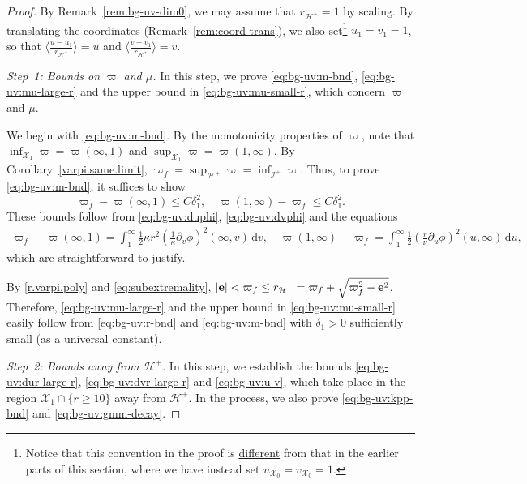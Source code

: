 \documentclass[10pt, reqno]{amsart}
\theoremstyle{definition}
\theoremstyle{remark}
\theoremstyle{conjecture}
\numberwithin{equation}{section}
\newcommand{\brk}[1]{\langle#1\rangle}
\newcommand{\set}[1]{\{#1\}}
\newcommand{\ud}{\mathrm{d}}
\newcommand{\rd}{\partial}
\newcommand{\0}{\emptyset}
\newcommand{\dlt}{\delta}
\newcommand{\kpp}{\kappa}
\newcommand{\bfe}{{\bf e}}
\newcommand{\calH}{\mathcal H}
\newcommand{\calI}{\mathcal I}
\newcommand{\calX}{\mathcal X}
\newcommand{\dur}{\nu}
\newcommand{\EH}{\calH^{+}}
\newcommand{\pfstep}[1]{\vspace{.5em} {\it \noindent #1.}}
\newcommand{\e}{\bfe}							%
\newcommand{\NI}{\calI^{+}}						%
\begin{document}
\begin{proof}
By Remark~\ref{rem:bg-uv-dim0}, we may assume that $r_{\EH} = 1$ by scaling. By translating the coordinates (Remark~\ref{rem:coord-trans}), we also set\footnote{Notice that this convention in the proof is \underline{different} from that in the earlier parts of this section, where we have instead set $u_{\calX_0}=v_{\calX_0}=1$.} $u_{1} = v_{1} = 1$, so that $\brk{\tfrac{u - u_{1}}{r_{\EH}}} = u$ and $\brk{\tfrac{v - v_{1}}{r_{\EH}}} = v$. 

\pfstep{Step~1: Bounds on $\varpi$ and $\mu$}
In this step, we prove \eqref{eq:bg-uv:m-bnd}, \eqref{eq:bg-uv:mu-large-r} and the upper bound in \eqref{eq:bg-uv:mu-small-r}, which concern $\varpi$ and $\mu$.

We begin with \eqref{eq:bg-uv:m-bnd}. By the monotonicity properties of $\varpi$, note that $\inf_{\calX_{1}} \varpi = \varpi(\infty, 1)$ and $\sup_{\calX_{1}} \varpi = \varpi(1, \infty)$. By Corollary~\ref{varpi.same.limit}, $\varpi_{f} = \sup_{\EH} \varpi = \inf_{\NI} \varpi$. Thus, to prove \eqref{eq:bg-uv:m-bnd}, it suffices to show
\begin{equation*}
	\varpi_{f} - \varpi(\infty, 1) \leq C \dlt_{1}^{2}, \quad
	\varpi(1, \infty) - \varpi_{f} \leq C \dlt_{1}^{2}.
\end{equation*}
These bounds follow from \eqref{eq:bg-uv:duphi}, \eqref{eq:bg-uv:dvphi} and the equations
\begin{align*}
\varpi_{f} - \varpi(\infty, 1)
= \int_{1}^{\infty} \frac{1}{2} \kpp r^{2} \left( \frac{1}{\kpp} \rd_{v} \phi \right)^{2} (\infty, v) \, \ud v, \quad
\varpi(1, \infty) - \varpi_{f}
= \int_{1}^{\infty} \frac{1}{2} \left( \frac{r}{\dur} \rd_{u} \phi \right)^{2} (u, \infty) \, \ud u,
\end{align*}
which are straightforward to justify.

By \eqref{r.varpi.poly} and \eqref{eq:subextremality}, $|\e| < \varpi_{f} \leq r_{\EH} = \varpi_{f} + \sqrt{\varpi_{f}^{2} - \e^{2}}$. Therefore, \eqref{eq:bg-uv:mu-large-r} and the upper bound in \eqref{eq:bg-uv:mu-small-r} easily follow from \eqref{eq:bg-uv:r-bnd} and \eqref{eq:bg-uv:m-bnd} with $\dlt_{1} > 0$ sufficiently small (as a universal constant).

\pfstep{Step~2: Bounds away from $\EH$}
In this step, we establish the bounds \eqref{eq:bg-uv:dur-large-r}, \eqref{eq:bg-uv:dvr-large-r} and \eqref{eq:bg-uv:u-v}, which take place in the region $\calX_{1} \cap \set{r \geq 10}$ away from $\EH$. In the process, we also prove \eqref{eq:bg-uv:kpp-bnd} and \eqref{eq:bg-uv:gmm-decay}.


\end{proof}
\end{document}
